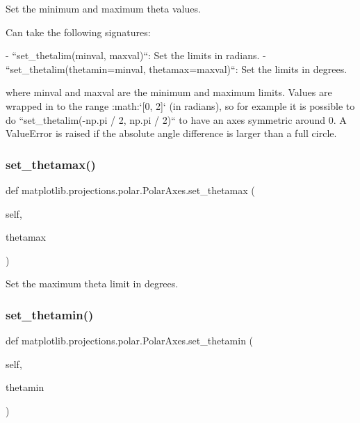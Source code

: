 \begin{DoxyVerb}Set the minimum and maximum theta values.

Can take the following signatures:

- ``set_thetalim(minval, maxval)``: Set the limits in radians.
- ``set_thetalim(thetamin=minval, thetamax=maxval)``: Set the limits
  in degrees.

where minval and maxval are the minimum and maximum limits. Values are
wrapped in to the range :math:`[0, 2\pi]` (in radians), so for example
it is possible to do ``set_thetalim(-np.pi / 2, np.pi / 2)`` to have
an axes symmetric around 0. A ValueError is raised if the absolute
angle difference is larger than a full circle.
\end{DoxyVerb}
 \mbox{\label{classmatplotlib_1_1projections_1_1polar_1_1PolarAxes_ad0f7116006e1c707e7e002c570b7f51a}} 
\subsubsection{\texorpdfstring{set\+\_\+thetamax()}{set\_thetamax()}}
{\footnotesize\ttfamily def matplotlib.\+projections.\+polar.\+Polar\+Axes.\+set\+\_\+thetamax (\begin{DoxyParamCaption}\item[{}]{self,  }\item[{}]{thetamax }\end{DoxyParamCaption})}

\begin{DoxyVerb}Set the maximum theta limit in degrees.\end{DoxyVerb}
 \mbox{\label{classmatplotlib_1_1projections_1_1polar_1_1PolarAxes_a8516391e626ee17ac0735a980a8cba71}} 
\subsubsection{\texorpdfstring{set\+\_\+thetamin()}{set\_thetamin()}}
{\footnotesize\ttfamily def matplotlib.\+projections.\+polar.\+Polar\+Axes.\+set\+\_\+thetamin (\begin{DoxyParamCaption}\item[{}]{self,  }\item[{}]{thetamin }\end{DoxyParamCaption})}

